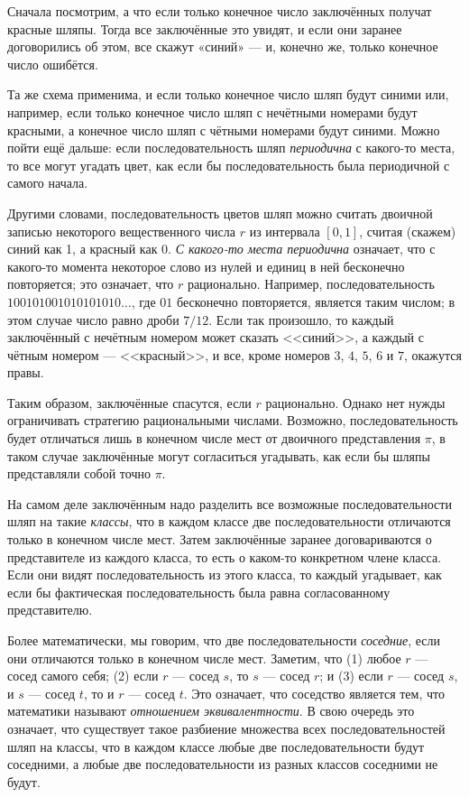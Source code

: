 Сначала посмотрим, а что если только конечное число заключённых получат красные шляпы.
Тогда все заключённые это увидят, и если они заранее договорились об этом, все скажут «синий» --- и, конечно же, только конечное число ошибётся.

Та же схема применима, и если только конечное число шляп будут синими или, например, если только конечное число шляп с нечётными номерами будут красными, а конечное число шляп с чётными номерами будут синими.
Можно пойти ещё дальше: если последовательность шляп \emph{периодична} с какого-то места, то все могут угадать цвет, как если бы последовательность была периодичной с самого начала.

Другими словами, последовательность цветов шляп можно считать двоичной записью некоторого вещественного числа $r$ из интервала $[0,1]$, считая (скажем) синий как 1, а красный как 0.
\emph{С какого-то места периодична} означает, что с какого-то момента некоторое слово из нулей и единиц в ней бесконечно повторяется;
это означает, что $r$ рационально.
Например, последовательность $100101001010101010\dots$, где $01$ бесконечно повторяется, является таким числом; в этом случае число равно дроби $7/12$.
Если так произошло, то каждый заключённый с нечётным номером может сказать <<синий>>, а каждый с чётным номером --- <<красный>>, и все, кроме номеров $3$, $4$, $5$, $6$ и $7$, окажутся правы.

Таким образом, заключённые спасутся, если $r$ рационально.
Однако нет нужды ограничивать стратегию рациональными числами.
Возможно, последовательность будет отличаться лишь в конечном числе мест от двоичного представления $\pi$, в таком случае заключённые могут согласиться угадывать, как если бы шляпы представляли собой точно $\pi$.

На самом деле заключённым надо разделить все возможные последовательности шляп на такие \emph{классы}, что в каждом классе две последовательности отличаются только в конечном числе мест.
Затем заключённые заранее договариваются о представителе из каждого класса, то есть о каком-то конкретном члене класса.
Если они видят последовательность из этого класса, то каждый угадывает, как если бы фактическая последовательность была равна согласованному представителю.

Более математически, мы говорим, что две последовательности \emph{соседние}, если они отличаются только в конечном числе мест.
Заметим, что
(1) любое $r$ --- сосед самого себя;
(2) если $r$ --- сосед $s$, то $s$ --- сосед $r$; и
(3) если $r$ --- сосед $s$, и $s$ --- сосед $t$, то и $r$ --- сосед $t$.
Это означает, что соседство является тем, что математики называют \emph{отношением эквивалентности}.
В свою очередь это означает, что существует такое разбиение множества всех последовательностей шляп на классы, что в каждом классе любые две последовательности будут соседними, а любые две последовательности из разных классов соседними не будут.

